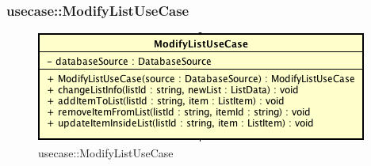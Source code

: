 \subsubsection{usecase::ModifyListUseCase}

\label{usecase::ModifyListUseCase}
\begin{figure}[H]
	\centering
	\includegraphics[scale=0.5]{Sezioni/SottosezioniST/img/app/ModifyListUseCase.png}
	\caption{usecase::ModifyListUseCase}
\end{figure}

